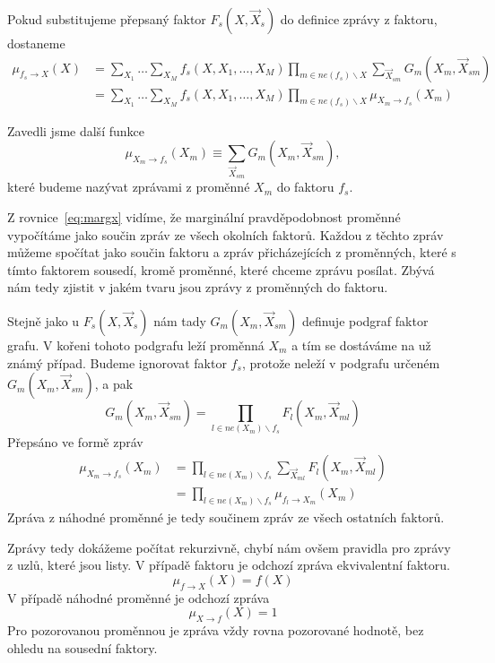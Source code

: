 Pokud substitujeme přepsaný faktor $F_s(X, \vec{X}_s)$ do definice zprávy z faktoru, dostaneme
\begin{align}
\mu_{f_s \rightarrow X}(X) &=
    \sum_{X_1} \dots \sum_{X_M}
        f_s(X, X_1, \dots, X_M)
        \prod_{m \in ne(f_s) \backslash X}
            \sum_{\vec{X}_{sm}}
                G_m(X_m, \vec{X}_{sm})
\\
&= \sum_{X_1} \dots \sum_{X_M}
    f_s(X, X_1, \dots, X_M)
    \prod_{m \in ne(f_s) \backslash X}
        \mu_{X_m \rightarrow f_s}(X_m)
\label{eq:mfsx}
\end{align}

Zavedli jsme další funkce 
\begin{equation}
    \mu_{X_m \rightarrow f_s}(X_m) \equiv \sum_{\vec{X}_{sm}} G_m(X_m, \vec{X}_{sm}),
\label{eq:defmsgxf}
\end{equation}
které budeme nazývat zprávami z proměnné $X_m$ do faktoru $f_s$.

Z rovnice~\ref{eq:margx} vidíme, že marginální pravděpodobnost proměnné vypočítáme jako součin zpráv ze všech okolních faktorů.
Každou z těchto zpráv můžeme spočítat jako součin faktoru a zpráv přicházejících z proměnných, které s tímto faktorem sousedí, kromě proměnné, které chceme zprávu posílat. Zbývá nám tedy zjistit v jakém tvaru jsou zprávy z proměnných do faktoru.

Stejně jako u $F_s(X, \vec{X}_s)$ nám tady $G_m(X_m, \vec{X}_{sm})$ definuje podgraf faktor grafu. 
V kořeni tohoto podgrafu leží proměnná $X_m$ a tím se dostáváme na už známý případ.
Budeme ignorovat faktor $f_s$, protože neleží v podgrafu určeném $G_m(X_m, \vec{X}_{sm})$, a pak 
\begin{equation}
    G_m(X_m, \vec{X}_{sm}) = \prod_{l \in ne(X_m) \backslash f_s} F_l(X_m, \vec{X}_{ml})
\end{equation}
Přepsáno ve formě zpráv
\begin{align}
\mu_{X_m \rightarrow f_s}(X_m)
&= \prod_{l \in ne(X_m) \backslash f_s}
    \sum_{\vec{X}_{ml}}
        F_l(X_m, \vec{X}_{ml})
\\
&= \prod_{l \in ne(X_m) \backslash f_s}
    \mu_{f_l \rightarrow X_m}(X_m)
\end{align}
Zpráva z náhodné proměnné je tedy součinem zpráv ze všech ostatních faktorů.

Zprávy tedy dokážeme počítat rekurzivně, chybí nám ovšem pravidla pro zprávy z uzlů, které jsou listy.
V případě faktoru je odchozí zpráva ekvivalentní faktoru.
\begin{equation}
    \mu_{f \rightarrow X}(X) = f(X)
\end{equation}
V případě náhodné proměnné je odchozí zpráva 
\begin{equation}
    \mu_{X \rightarrow f}(X) = 1
\end{equation}
Pro pozorovanou proměnnou je zpráva vždy rovna pozorované hodnotě, bez ohledu na sousední faktory.

